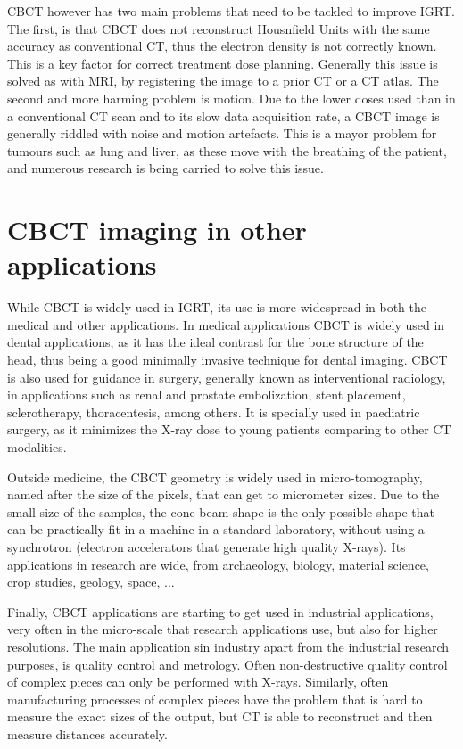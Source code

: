 CBCT however has two main problems that need to be tackled to improve IGRT. The first, is that CBCT does not reconstruct Housnfield Units with the same accuracy as conventional CT, thus the electron density is not correctly known. This is a key factor for correct treatment dose planning. Generally this issue is solved as with MRI, by registering the image to a prior CT or a CT atlas. The second and more harming problem is motion. Due to the lower doses used than in a conventional CT scan and to its slow data acquisition rate, a CBCT image is generally riddled with noise and motion artefacts. This is a mayor problem for tumours such as lung and liver, as these move with the breathing of the patient, and numerous research is being carried to solve this issue.


\section{CBCT imaging in other applications}

While CBCT is widely used in IGRT, its use is more widespread in both the medical and other applications. In medical applications CBCT is widely used in dental applications\cite{alamri2012applications}, as it has the ideal contrast for the bone structure of the head, thus being a good minimally invasive technique for dental imaging. CBCT is also used for guidance in surgery, generally known as interventional radiology, in applications such as renal and prostate embolization\cite{floridi2014c}, stent placement, sclerotherapy, thoracentesis\cite{Acord2017}, among others. It is specially used in paediatric surgery, as it minimizes the X-ray dose to young patients comparing to other CT modalities.

Outside medicine, the CBCT geometry is widely used in micro-tomography, named after the size of the pixels, that can get to micrometer sizes. Due to the small size of the samples, the cone beam shape is the only possible shape that can be practically fit in a machine in a standard laboratory, without using a synchrotron (electron accelerators that generate high quality X-rays). Its applications in research are wide, from archaeology, biology, material science, crop studies, geology, space, ...

Finally, CBCT applications are starting to get used in industrial applications, very often in the micro-scale that research applications use, but also for higher resolutions. The main application sin industry apart from the industrial research purposes, is quality control and metrology. Often non-destructive quality control of complex pieces can only be performed with X-rays. Similarly, often manufacturing processes of complex pieces have the problem that is hard to measure the exact sizes of the output, but CT is able to reconstruct and then measure distances accurately.
